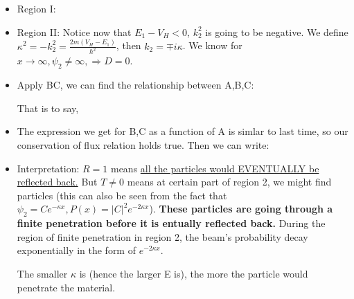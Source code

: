 \documentclass{school-22.101-notes}
\begin{document}
\begin{itemize}
\item Region I: 

\item Region II:
Notice now that $E_1 - V_H < 0$, $k_2^2$ is going to be negative. We define $\kappa^2 = - k_2^2 = \frac{2 m (V_H - E_1)}{\hbar^2}$, then $k_2 = \mp i \kappa$.
We know for $x \to \infty, \psi_2 \neq \infty, \Rightarrow D = 0$. 

\item Apply BC, we can find the relationship between A,B,C:

That is to say,

\item The expression we get for B,C as a function of A is simlar to last time, so our conservation of flux relation holds true. Then we can write: 


\item Interpretation: $R = 1$ means \uline{all the particles would EVENTUALLY be reflected back.} But $T \neq 0$ means at certain part of region 2, we might find particles (this can also be seen from the fact that $\psi_2 = C e^{-\kappa x}, P(x) = |C|^2 e^{-2 \kappa x}$). \textbf{These particles are going through a finite penetration before it is entually reflected back.} During the region of finite penetration in region 2, the beam's probability decay exponentially in the form of $e^{-2\kappa x}$. 

The smaller $\kappa$ is (hence the larger E is), the more the particle would penetrate the material. 
\end{itemize}
\end{document}
